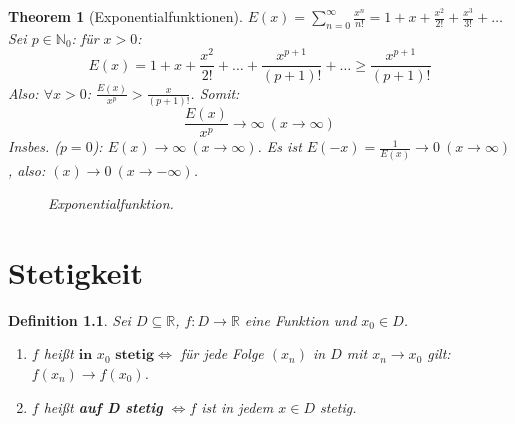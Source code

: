 \documentclass{extreport}
\newcommand{\N}{\mathbb{N}}
\newcommand{\R}{\mathbb{R}}
\theoremstyle{named}
\newtheorem{namedtheorem}{Theorem} \counterwithin{namedtheorem}{chapter}
\theoremstyle{dotless}
\newtheorem*{definition}{Definition}
\begin{document}
\begin{namedtheorem}[Exponentialfunktionen] \label{6.4:prop-Exponentialfunktionen}
	$E(x) = \sum_{n=0}^{\infty} \frac{x^{n}}{n!} = 1 + x + \frac{x^{2}}{2!} + \frac{x^{3}}{3!} + \dotsc$ \\
	Sei $p \in \N_{0}$: für $x > 0$:
		$$ E(x) = 1 + x + \frac{x^{2}}{2!} + \dotsc + \frac{x^{p+1}}{(p+1)!} + \dotsc \geq \frac{x^{p+1}}{(p+1)!} $$
	Also: $\forall x > 0$: $\frac{E(x)}{x^{p}} > \frac{x}{(p+1)!}$.
	Somit:
		$$ \frac{E(x)}{x^{p}} \rightarrow \infty ~(x \rightarrow \infty) $$
	Insbes. ($p = 0$): $E(x) \rightarrow \infty ~(x \rightarrow \infty)$. Es ist $E(-x) = \frac{1}{E(x)} \rightarrow 0 ~(x \rightarrow \infty)$, also: $(x) \rightarrow  0 ~(x \rightarrow -\infty)$.
	\begin{figure*}[!ht] \centering
		\caption{Exponentialfunktion.}	
	\end{figure*}
\end{namedtheorem}


\newpage


\chapter{Stetigkeit}

\begin{definition}
	Sei $D \subseteq \R$, $f \colon D \rightarrow \R$ eine Funktion und $x_{0} \in D$. 
	\begin{enumerate}
		\item $f$ hei{\ss}t $\textbf{in }  x_{0} \textbf{ stetig} \iff$ für jede Folge $(x_{n})$ in $D$ mit $x_{n} \rightarrow x_{0}$ gilt: $f(x_{n}) \rightarrow f(x_{0})$.
		\item $f$ hei{\ss}t \textbf{auf D stetig} $\iff f$ ist in jedem $x \in D$ stetig.
	\end{enumerate}
\end{definition}
\end{document}
